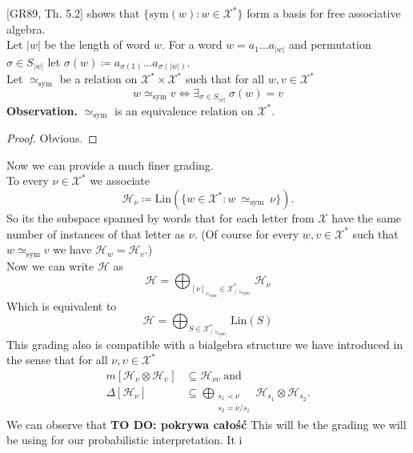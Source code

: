 \documentclass[a4paper, 12pt]{report}
\newcommand{\todo}[1]{\hfill \break \textbf{\Huge TO DO: #1 \hfill \break}\normalsize}
\newcommand{\SimeqSym}{{\simeq_\mathrm{sym}}}
\begin{document}
[GR89, Th. 5.2] shows that $\{\mathrm{sym}(w) : w \in \mathcal{X^*}\}$ form a basis for free associative
algebra. \\
Let $|w|$ be the length of word $w$. For a word $w = a_1\dots a_{|w|}$ and permutation
$\sigma \in S_{|w|}$ let $\sigma(w) \coloneqq a_{\sigma(1)}\dots a_{\sigma(|w|)}$. \\
Let $\simeq_\mathrm{sym}$ be
a relation on $\mathcal{X}^* \times \mathcal{X}^*$ such that for all $w, v \in \mathcal{X}^*$
\begin{equation*}
w \simeq_\mathrm{sym} v \iff \exists_{\sigma \in S_{|w|}}\ \sigma(w) = v
\end{equation*}
\textbf{Observation.} $\simeq_\mathrm{sym}$ is an equivalence relation on $\mathcal{X}^*$.
\begin{proof}
Obvious.
\end{proof}
\noindent Now we can provide a much finer grading. \\
To every $\nu \in \mathcal{X}^*$ we associate
\begin{equation}
\mathcal{H}_\nu \coloneqq \mathrm{Lin}(\{w \in \mathcal{X}^* : w\ \SimeqSym\ \nu\}).
\end{equation}
So its the subspace spanned by words that for each letter from $\mathcal{X}$ have the same number of
instances of that letter as
$\nu$. (Of course for every $w, v \in \mathcal{X}^*$ such that $w \SimeqSym v$ we have
$\mathcal{H}_w = \mathcal{H}_v$.) \\
Now we can write $\mathcal{H}$ as
\begin{equation*}
\mathcal{H} = \bigoplus_{{[\nu]}_\SimeqSym \in \mathcal{X}^*_{/\SimeqSym}} \mathcal{H}_\nu
\end{equation*}
Which is equivalent to
\begin{equation*}
\mathcal{H} = \bigoplus_{S \in \mathcal{X}^*_{/\SimeqSym}} \mathrm{Lin}(S)
\end{equation*}
This grading also is compatible with a bialgebra structure we have introduced in the sense that for all
$\nu, \upsilon \in \mathcal{X}^*$
\begin{align*}
m[\mathcal{H}_\nu \otimes \mathcal{H}_\upsilon] &\subseteq \mathcal{H}_{\nu\upsilon} \mathrm{\ and} \\
\Delta[\mathcal{H}_\nu] &\subseteq \bigoplus_{\substack{s_1 \prec \nu \\ s_2 = \nu/ s_1}}
\mathcal{H}_{s_1} \otimes \mathcal{H}_{s_2}.
\end{align*}
We can observe that
\todo{pokrywa całość}
This will be the grading we will be using for our probabilistic interpretation. It i
\end{document}
